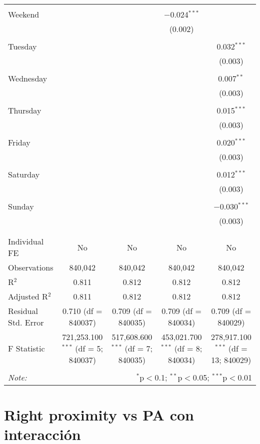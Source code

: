 \documentclass[
]{article}
\begin{document}
\begin{table}[!htbp]
{\begin{tabular}{@{\extracolsep{5pt}}lcccc}
  & & & & \\ 
 Weekend &  &  & $-$0.024$^{***}$ &  \\ 
  &  &  & (0.002) &  \\ 
  & & & & \\ 
 Tuesday &  &  &  & 0.032$^{***}$ \\ 
  &  &  &  & (0.003) \\ 
  & & & & \\ 
 Wednesday &  &  &  & 0.007$^{**}$ \\ 
  &  &  &  & (0.003) \\ 
  & & & & \\ 
 Thursday &  &  &  & 0.015$^{***}$ \\ 
  &  &  &  & (0.003) \\ 
  & & & & \\ 
 Friday &  &  &  & 0.020$^{***}$ \\ 
  &  &  &  & (0.003) \\ 
  & & & & \\ 
 Saturday &  &  &  & 0.012$^{***}$ \\ 
  &  &  &  & (0.003) \\ 
  & & & & \\ 
 Sunday &  &  &  & $-$0.030$^{***}$ \\ 
  &  &  &  & (0.003) \\ 
  & & & & \\ 
\hline \\[-1.8ex] 
Individual FE & No & No & No & No \\ 
Observations & 840,042 & 840,042 & 840,042 & 840,042 \\ 
R$^{2}$ & 0.811 & 0.812 & 0.812 & 0.812 \\ 
Adjusted R$^{2}$ & 0.811 & 0.812 & 0.812 & 0.812 \\ 
Residual Std. Error & 0.710 (df = 840037) & 0.709 (df = 840035) & 0.709 (df = 840034) & 0.709 (df = 840029) \\ 
F Statistic & 721,253.100$^{***}$ (df = 5; 840037) & 517,608.600$^{***}$ (df = 7; 840035) & 453,021.700$^{***}$ (df = 8; 840034) & 278,917.100$^{***}$ (df = 13; 840029) \\ 
\hline 
\hline \\[-1.8ex] 
\textit{Note:}  & \multicolumn{4}{r}{$^{*}$p$<$0.1; $^{**}$p$<$0.05; $^{***}$p$<$0.01} \\ 
\end{tabular}
} 
\end{table} 
\newpage
\section{Right proximity vs PA con interacción}
\end{document}
